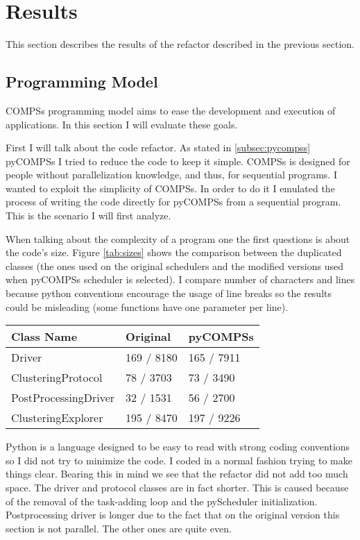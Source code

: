 \chapter{Results}


This section describes the results of the refactor described in the previous section. 

\section{Programming Model}

COMPSs programming model aims to ease the development and execution of applications. In this section I will evaluate these goals.

First I will talk about the code refactor. As stated in \ref{subsec:pycompss} pyCOMPSs I tried to reduce the code to keep it simple. COMPSs is designed for people without parallelization knowledge, and thus, for sequential programs. I wanted to exploit the simplicity of COMPSs. In order to do it I emulated the process of writing the code directly for pyCOMPSs from a sequential program. This is the scenario I will first analyze.

When talking about the complexity of a program one the first questions is about the code's size. Figure \ref{tab:sizes} shows the comparison between the duplicated classes (the ones used on the original schedulers and the modified versions used when pyCOMPSs scheduler is selected). I compare number of characters and lines because python conventions encourage the usage of line breaks so the results could be misleading (some functions have one parameter per line).


\begin{center}
	\begin{tabular}{| R{6cm} | L{3cm} | L{3cm} |}
		\hline
		Class Name & Original & pyCOMPSs \\ 
		\hline
		\hline
		Driver & 169 / 8180  &  165 / 7911 \\
		\hline
		ClusteringProtocol & 78 / 3703 & 73 / 3490 \\
		\hline
		PostProcessingDriver & 32 / 1531 & 56 / 2700 \\
		\hline
		ClusteringExplorer & 195 / 8470 & 197 / 9226 \\ 
		\hline
	\end{tabular}
	\label{tab:sizes}
\end{center}


Python is a language designed to be easy to read with strong coding conventions so I did not try to minimize the code. I coded in a normal fashion trying to make things clear. Bearing this in mind we see that the refactor did not add too much space. The driver and protocol classes are in fact shorter. This is caused because of the removal of the task-adding loop and the pyScheduler initialization. Postprocessing driver is longer due to the fact that on the original version this section is not parallel. The other ones are quite even.

